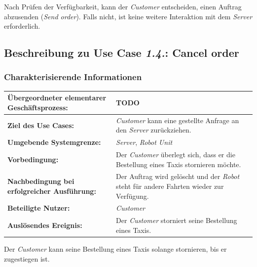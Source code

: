 				Nach Prüfen der Verfügbarkeit, kann der \emph{Customer} entscheiden, einen Auftrag abzusenden (\emph{Send order}). Falls nicht, ist keine weitere Interaktion mit dem \emph{Server} erforderlich.
				
				
				\pagebreak
		
			\subsection*{Beschreibung zu Use Case \emph{1.4.}: Cancel order}
				\subsubsection*{Charakterisierende Informationen}
				
				\begin{table}[H]
					\centering
					\begin{tabularx}{\textwidth}{|p{5cm}|X|}
						\hline
						\textbf{Übergeordneter elementarer Geschäftsprozess:} & TODO  \\ \hline
						\textbf{Ziel des Use Cases:} & \emph{Customer} kann eine gestellte Anfrage an den \emph{Server} zurückziehen. \\ \hline
						\textbf{Umgebende Systemgrenze:} & \emph{Server}, \emph{Robot Unit} \\ \hline
						\textbf{Vorbedingung:} & Der \emph{Customer} überlegt sich, dass er die Bestellung eines Taxis stornieren möchte. \\ \hline
						\textbf{Nachbedingung bei erfolgreicher Ausführung:} & Der Auftrag wird gelöscht und der \emph{Robot} steht für andere Fahrten wieder zur Verfügung. \\ \hline
						\textbf{Beteiligte Nutzer:} & \emph{Customer} \\ \hline
						\textbf{Auslösendes Ereignis:} & Der \emph{Customer} storniert seine Bestellung eines Taxis. \\
						\hline
					\end{tabularx}
				\end{table}
				
				Der \emph{Customer} kann seine Bestellung eines Taxis solange stornieren, bis er zugestiegen ist.
				
			
